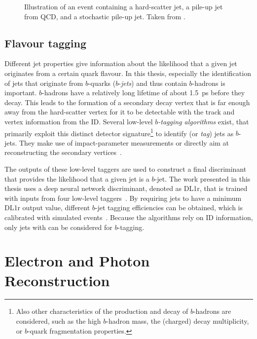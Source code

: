 \begin{figure}
    \caption{Illustration of an event containing a hard-scatter jet, a pile-up jet from QCD, and a stochastic pile-up jet. Taken from .}
    \label{fig:pile-up-jets-illustration}
\end{figure}


\subsection{Flavour tagging}
Different jet properties give information about the likelihood that a given jet originates from a certain quark flavour.
In this thesis, especially the identification of jets that originate from $b$-quarks ($b$-\emph{jets}) and thus contain $b$-hadrons is important. $b$-hadrons have a relatively long lifetime of about \SI{1.5}{\pico\second} before they decay. This leads to the formation of a secondary decay vertex that is far enough away from the hard-scatter vertex for it to be detectable with the track and vertex information from the ID.
Several low-level \emph{$b$-tagging algorithms} exist, that primarily exploit this distinct detector signature\footnote{Also other characteristics of the production and decay of $b$-hadrons are considered, such as the high $b$-hadron mass, the (charged) decay multiplicity, or $b$-quark fragmentation properties.} to identify (or \emph{tag}) jets as $b$-jets. They make use of impact-parameter measurements or directly aim at reconstructing the secondary vertices~\cite{ATL-PHYS-PUB-2017-013}.

The outputs of these low-level taggers are used to construct a final discriminant that provides the likelihood that a given jet is a $b$-jet. The work presented in this thesis uses a deep neural network discriminant, denoted as DL1r, that is trained with inputs from four low-level taggers~\cite{ATL-PHYS-PUB-2017-013}.
By requiring jets to have a minimum DL1r output value, different $b$-jet tagging efficiencies can be obtained, which is calibrated with simulated \ttbar events~\cite{FTAG-2018-01}.
Because the algorithms rely on ID information, only jets with  can be considered for $b$-tagging.



\section{Electron and Photon Reconstruction}
\label{sec:electron-photon-reconstruction}


